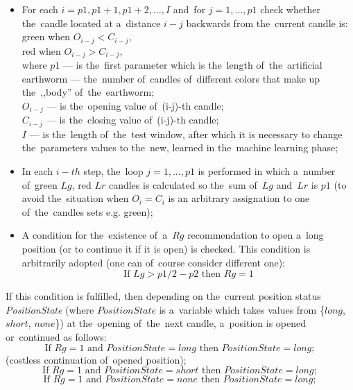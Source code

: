 \documentclass[runningheads,a4paper]{llncs}
\begin{document}
\begin{itemize}
\item For each $i = p1, p1 +1, p1 +2, ..., I$ and~for $j = 1, ..., p1$ check whether the~candle located at a~distance $i-j$ backwards from the~current candle is:\\
green when $O_{i-j} <C_{i-j}$, \\
red when $O_{i-j}> C_{i-j}$, \\
where $p1$ --- is the~first parameter which is the~length of~the~artificial earthworm --- the~number of~candles of~different colors that make up the~,,body'' of~the~earthworm; \\
$O_{i-j}$ --- is the~opening value of~(i-j)-th candle;\\ 
$C_{i-j}$ --- is the~closing value of~(i-j)-th candle; \\
$I$ --- is the~length of~the~test window, after which it is necessary to change the~parameters values to the~new, learned in the~machine learning phase;\\
\item In each $i-th$ step, the~loop $j = 1, ..., p1$ is performed in which a~number of~green $Lg$, red $Lr$ candles is calculated so the~sum of~$Lg$ and~$Lr$ is $p1$ (to avoid the~situation when $O_i = C_i$ is an arbitrary assignation to one of~the~candles sets e.g. green);
\item A condition for the~existence of~a~$Rg$ recommendation to open a~long position (or to continue it if it is open) is checked. This condition is arbitrarily adopted (one can of~course consider different one): 
\begin{equation}
\text{If } Lg> p1/2-p2 \text{ then } Rg=1
\end{equation}  
                                                     
\end{itemize}
If this condition is fulfilled, then depending on the~current position status \textit{PositionState} (where $PositionState$ is a~variable which takes values from \{$long$, $short$, $none$\}) at the~opening of~the~next candle, a~position is opened or~continued as follows: 
\begin{equation}
\text{If } Rg=1 \text{ and~} PositionState =long \text{ then }PositionState =long;
\end{equation}
(costless continuation of~opened position);
\begin{equation}
\text{If } Rg=1 \text{ and~} PositionState = short \text{ then } PositionState=long;
\end{equation}
\begin{equation}
\text{If } Rg=1 \text{ and~} PositionState =none \text{ then } PositionState =long;
\end{equation}
\end{document}
